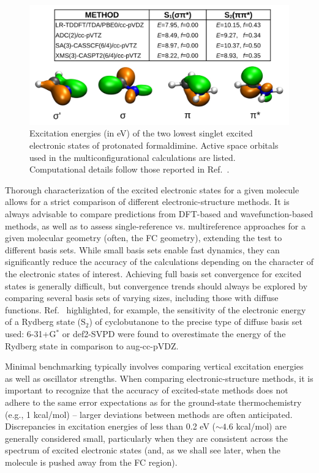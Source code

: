 \documentclass[9pt,bestpractices]{livecoms}
\begin{document}
\begin{figure}[h!]
    \centering
    \includegraphics[width=0.7\linewidth]{./figures/formaldimine_exc.png}
    \caption{Excitation energies (in eV) of the two lowest singlet excited electronic states of protonated formaldimine. Active space orbitals used in the multiconfigurational calculations are listed. Computational details follow those reported in Ref.~.}
    \label{fig:formaldimine_exc}
\end{figure}

Thorough characterization of the excited electronic states for a given molecule allows for a strict comparison of different electronic-structure methods. It is always advisable to compare predictions from DFT-based and wavefunction-based methods, as well as to assess single-reference vs. multireference approaches for a given molecular geometry (often, the FC geometry), extending the test to different basis sets.  While small basis sets enable fast dynamics, they can significantly reduce the accuracy of the calculations depending on the character of the electronic states of interest. Achieving full basis set convergence for excited states is generally difficult, but convergence trends should always be explored by comparing several basis sets of varying sizes, including those with diffuse functions. Ref.~ highlighted, for example, the sensitivity of the electronic energy of a Rydberg state (S$_2$) of cyclobutanone to the precise type of diffuse basis set used: 6-31+G$^\ast$ or def2-SVPD were found to overestimate the energy of the Rydberg state in comparison to aug-cc-pVDZ. 

Minimal benchmarking typically involves comparing vertical excitation energies as well as oscillator strengths. When comparing electronic-structure methods, it is important to recognize that the accuracy of excited-state methods does not adhere to the same error expectations as for the ground-state thermochemistry (e.g.,  1 kcal/mol) -- larger deviations between methods are often anticipated. Discrepancies in excitation energies of less than 0.2 eV ($\sim 4.6$ kcal/mol) are generally considered small, particularly when they are consistent across the spectrum of excited electronic states (and, as we shall see later, when the molecule is pushed away from the FC region).
\end{document}
